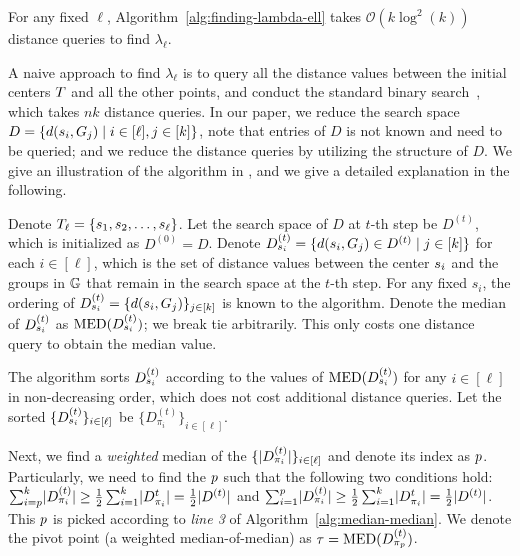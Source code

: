 \documentclass{article}
\newcommand{\bigO}{\ensuremath{\mathcal{O}}\xspace}
\begin{document}
\begin{theorem}
    \label{theorem:min-lambda-with-perfect-matching}
    For any fixed $\ell$, Algorithm~\ref{alg:finding-lambda-ell} takes $\bigO(k \log^2(k))$ distance queries to find $\lambda_\ell$.
\end{theorem}

A naive approach to find $\lambda_{\ell}$ is to query all the distance values between the initial centers $T$ and all the other points, and conduct the standard binary search~\cite{gadekar2025fair}, which takes $nk$ distance queries.  
In our paper, we reduce the search space $D = \{d(s_i, G_j) \mid i \in [\ell], j \in [k]\}$, note that entries of $D$ is not known and need to be queried; and we reduce the distance queries by utilizing the structure of $D$.
We give an illustration of the algorithm in , and we give a detailed explanation in the following. 


Denote $T_{\ell} = \{s_1, s_2, \dots, s_{\ell}\}$. 
Let the search space of $D$ at $t$-th step be $D^{(t)}$, which is initialized as $D^{(0)} = D$.  
Denote $D_{s_i}^{(t)} = \{d(s_i, G_j) \in D^{(t)} \mid j \in [k]\}$ for each $i \in [\ell]$, which is the set of distance values between the center $s_i$ and the groups in $\mathbb{G}$ that remain in the search space at the $t$-th step.
For any fixed $s_i$, the ordering of $D_{s_i}^{(t)} = \{d(s_i, G_j)\}_{j \in [k]}$ is known to the algorithm.
Denote the median of $D_{s_i}^{(t)}$ as $\operatorname{MED}(D_{s_i}^{(t)})$; we break tie arbitrarily.  
This only costs one distance query to obtain the median value. 

The algorithm sorts $D_{s_i}^{(t)}$ according to the values of $\operatorname{MED}(D_{s_i}^{(t)})$ for any $i \in [\ell]$ in non-decreasing order, which does not cost additional distance queries.  
Let the sorted $\{D_{s_i}^{(t)}\}_{i \in [\ell]}$ be $\{D_{\pi_i}^{(t)}\}_{i \in [\ell]}$.

Next, we find a \emph{weighted} median of the $\{\lvert D_{\pi_i}^{(t)} \rvert \}_{i \in [\ell]}$ and denote its index as $p$. 
Particularly, we need to find the $p$ such that the following two conditions hold:
$\sum_{i=p}^{k} \lvert D_{\pi_i}^{(t)} \rvert  \geq \frac{1}{2}\sum_{i=1}^k \lvert D_{\pi_i}^{{t}} \rvert  = \frac{1}{2} \lvert D^{(t)} \rvert $ and $\sum_{i=1}^{p} \lvert D_{\pi_i}^{(t)} \rvert  \geq \frac{1}{2}\sum_{i=1}^k \lvert D_{\pi_i}^{{t}} \rvert  = \frac{1}{2} \lvert D^{(t)} \rvert $.
This $p$ is picked according to \emph{line 3} of Algorithm~\ref{alg:median-median}.
We denote the pivot point (a weighted median-of-median) as $\tau = \operatorname{MED}(D_{\pi_{p}}^{(t)})$. 
\end{document}
